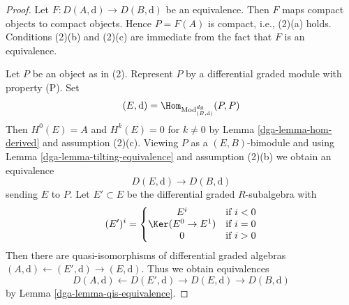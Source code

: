 \begin{proof}

Let $F : D(A, \text{d}) \to D(B, \text{d})$ be an equivalence.
Then $F$ maps compact objects to compact objects. Hence $P = F(A)$ is
compact, i.e., (2)(a) holds. Conditions (2)(b) and (2)(c) are immediate
from the fact that $F$ is an equivalence.

\medskip\noindent
Let $P$ be an object as in (2). Represent $P$ by a
differential graded module with property (P). Set
$$
(E, \text{d}) = \Hom_{\text{Mod}^{dg}_{(B, \text{d})}}(P, P)
$$
Then $H^0(E) = A$ and $H^k(E) = 0$ for $k \not = 0$ by
Lemma \ref{dga-lemma-hom-derived} and assumption (2)(c).
Viewing $P$ as a $(E, B)$-bimodule and using
Lemma \ref{dga-lemma-tilting-equivalence} and assumption (2)(b)
we obtain an equivalence
$$
D(E, \text{d}) \to D(B, \text{d})
$$
sending $E$ to $P$.
Let $E' \subset E$ be the differential graded $R$-subalgebra
with
$$
(E')^i = \left\{
\begin{matrix}
E^i & \text{if }i < 0 \\
\Ker(E^0 \to E^1) & \text{if }i = 0 \\
0 & \text{if }i > 0
\end{matrix}
\right.
$$
Then there are quasi-isomorphisms of differential graded
algebras $(A, \text{d}) \leftarrow (E', \text{d}) \rightarrow (E, \text{d})$.
Thus we obtain equivalences
$$
D(A, \text{d}) \leftarrow D(E', \text{d}) \rightarrow D(E, \text{d})
\rightarrow D(B, \text{d})
$$
by Lemma \ref{dga-lemma-qis-equivalence}.
\end{proof}

